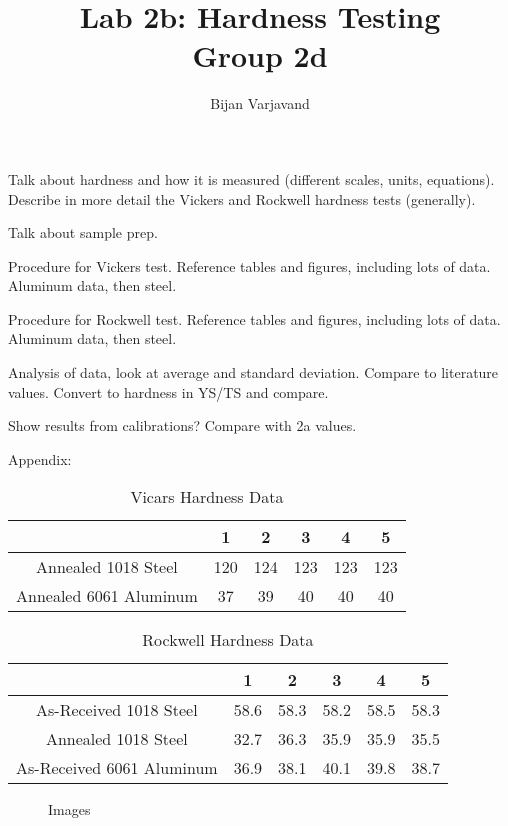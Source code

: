 \documentclass{article}
\author{Bijan Varjavand}
\title{Lab 2b: Hardness Testing\\Group 2d}
\begin{document}
\maketitle

\clearpage

Talk about hardness and how it is measured (different scales, units, equations). Describe in more detail the Vickers and Rockwell hardness tests (generally).

Talk about sample prep.

Procedure for Vickers test. Reference tables and figures, including lots of data. Aluminum data, then steel.

Procedure for Rockwell test. Reference tables and figures, including lots of data. Aluminum data, then steel.

Analysis of data, look at average and standard deviation. Compare to literature values. Convert to hardness in YS/TS and compare.

Show results from calibrations? Compare with 2a values.

\clearpage

Appendix:\\

\begin{table}[h]
\centering
\begin{tabular}{||c | c | c | c | c | c||}
	\hline
	\ 	&
	1	&	2	&	3	&	4	&	5\\
	\hline\hline
	Annealed 1018 Steel		&
	120	&	124	&	123	&	123	&	123\\
	Annealed 6061 Aluminum	&
	37	&	39	&	40	&	40	&	40\\
	\hline
\end{tabular}
\caption{Vicars Hardness Data}
\end{table}

\begin{table}[h]
\centering
\begin{tabular}{||c | c | c | c | c | c||}
	\hline
	\ 	&
	1	&	2	&	3	&	4	&	5\\
	\hline\hline
	As-Received 1018 Steel		&
	58.6	&	58.3	&	58.2	&	58.5	&	58.3\\
	Annealed 1018 Steel		&
	32.7	&	36.3	&	35.9	&	35.9	&	35.5\\
	As-Received 6061 Aluminum	&
	36.9	&	38.1	&	40.1	&	39.8	&	38.7\\
	\hline
\end{tabular}
\caption{Rockwell Hardness Data}
\end{table}

\begin{figure}[h]
	\centering
	\caption{Images}
\end{figure}
\end{document}
